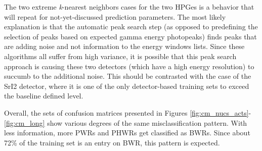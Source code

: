 The two extreme \textit{k}-nearest neighbors cases for the two \gls{HPGe}s is a
behavior that will repeat for not-yet-discussed prediction parameters.  The
most likely explanation is that the automatic peak search step (as opposed to
predefining the selection of peaks based on expected gamma energy photopeaks)
finds peaks that are adding noise and not information to the energy windows
lists.  Since these algorithms all suffer from high variance, it is possible
that this peak search approach is causing these two detectors (which have a
high energy resolution) to succumb to the additional noise. This should be
contrasted with the case of the \gls{SrI2} detector, where it is one of the
only detector-based training sets to exceed the baseline defined level.

Overall, the sets of confusion matrices presented in Figures
\ref{fig:cm_nucs_acts}-\ref{fig:cm_long} show various degrees of the same
misclassification pattern. With less information, more \gls{PWR}s and
\gls{PHWR}s get classified as \gls{BWR}s. Since about 72\% of the training set
is an entry on \gls{BWR}, this pattern is expected.

